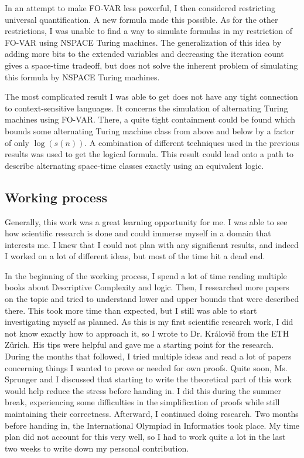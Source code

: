 In an attempt to make FO-VAR less powerful, I then considered restricting universal quantification.
A new formula made this possible.
As for the other restrictions, I was unable to find a way to simulate formulas in my restriction of FO-VAR using NSPACE Turing machines.
The generalization of this idea by adding more bits to the extended variables and decreasing the iteration count gives a space-time tradeoff, but does not solve the inherent problem of simulating this formula by NSPACE Turing machines.

The most complicated result I was able to get does not have any tight connection to context-sensitive languages.
It concerns the simulation of alternating Turing machines using FO-VAR\@.
There, a quite tight containment could be found which bounds some alternating Turing machine class from above and below by a factor of only $\log(s(n))$.
A combination of different techniques used in the previous results was used to get the logical formula.
This result could lead onto a path to describe alternating space-time classes exactly using an equivalent logic.

\subsection{Working process}\label{subsec:working-process}
Generally, this work was a great learning opportunity for me.
I was able to see how scientific research is done and could immerse myself in a domain that interests me.
I knew that I could not plan with any significant results, and indeed I worked on a lot of different ideas, but most of the time hit a dead end.

In the beginning of the working process, I spend a lot of time reading multiple books about Descriptive Complexity and logic.
Then, I researched more papers on the topic and tried to understand lower and upper bounds that were described there.
This took more time than expected, but I still was able to start investigating myself as planned.
As this is my first scientific research work, I did not know exactly how to approach it, so I wrote to Dr. Královi\v{c} from the ETH Zürich.
His tips were helpful and gave me a starting point for the research.
During the months that followed, I tried multiple ideas and read a lot of papers concerning things I wanted to prove or needed for own proofs.
Quite soon, Ms. Sprunger and I discussed that starting to write the theoretical part of this work would help reduce the stress before handing in.
I did this during the summer break, experiencing some difficulties in the simplification of proofs while still maintaining their correctness.
Afterward, I continued doing research.
Two months before handing in, the International Olympiad in Informatics took place.
My time plan did not account for this very well, so I had to work quite a lot in the last two weeks to write down my personal contribution.

